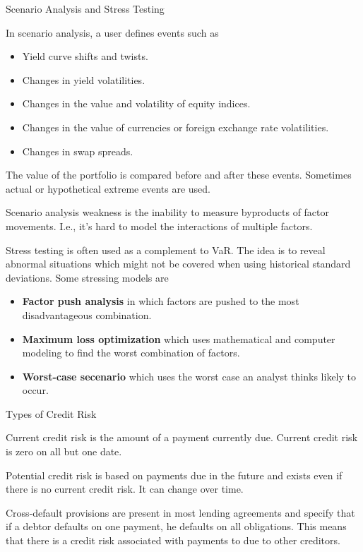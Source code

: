 \documentclass[../custom,grid]{flashcards}
\newcommand{\studyArea}{Risk Management}
\begin{document}
\begin{flashcard}[\studyArea]{Scenario Analysis and Stress Testing}
    \begin{flushleft}
        In scenario analysis, a user defines events such as
        \begin{itemize}[parsep=1pt,itemsep=1pt]
            \item Yield curve shifts and twists.
            \item Changes in yield volatilities.
            \item Changes in the value and volatility of equity indices.
            \item Changes in the value of currencies or foreign exchange rate volatilities.
            \item Changes in swap spreads.
        \end{itemize}
        The value of the portfolio is compared before and after these events. Sometimes actual or hypothetical extreme events are used.\newline

        Scenario analysis weakness is the inability to measure byproducts of factor movements. I.e., it's hard to model the interactions of multiple factors.\newline

        Stress testing is often used as a complement to VaR. The idea is to reveal abnormal situations which might not be covered when using historical standard deviations. Some stressing models are
        \begin{itemize}[parsep=1pt,itemsep=1pt]
            \item \textbf{Factor push analysis} in which factors are pushed to the most disadvantageous combination.
            \item \textbf{Maximum loss optimization} which uses mathematical and computer modeling to find the worst combination of factors.
            \item \textbf{Worst-case secenario} which uses the worst case an analyst thinks likely to occur.
        \end{itemize}
    \end{flushleft}
\end{flashcard}

\begin{flashcard}[\studyArea]{Types of Credit Risk}
    \begin{flushleft}
        Current credit risk is the amount of a payment currently due. Current credit risk is zero on all but one date.\newline

        Potential credit risk is based on payments due in the future and exists even if there is no current credit risk. It can change over time.\newline

        Cross-default provisions are present in most lending agreements and specify that if a debtor defaults on one payment, he defaults on all obligations. This means that there is a credit risk associated with payments to due to other creditors.
    \end{flushleft}
\end{flashcard}
\end{document}
